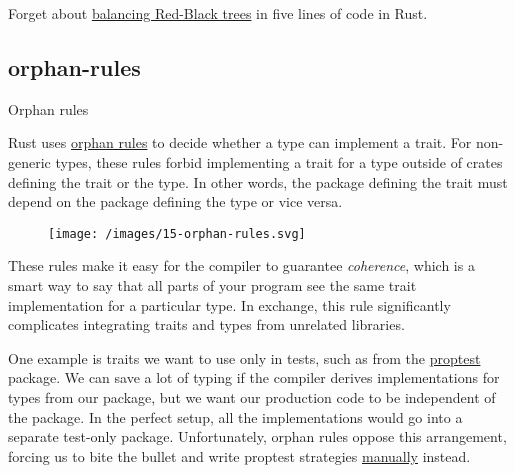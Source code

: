 \documentclass{article}
\begin{document}
Forget about \href{https://www.cs.tufts.edu/comp/150FP/archive/chris-okasaki/redblack99.pdf}{balancing Red-Black trees} in five lines of code in Rust.

\subsection{orphan-rules}{Orphan rules}

Rust uses \href{https://doc.rust-lang.org/reference/items/implementations.html?highlight=orphan#orphan-rules}{orphan rules} to decide whether a type can implement a trait.
For non-generic types, these rules forbid implementing a trait for a type outside of crates defining the trait or the type.
In other words, the package defining the trait must depend on the package defining the type or vice versa.

\begin{figure}[grayscale-diagram]
\texttt{[image: /images/15-orphan-rules.svg]}
\end{figure}

These rules make it easy for the compiler to guarantee \emph{coherence}, which is a smart way to say that all parts of your program see the same trait implementation for a particular type.
In exchange, this rule significantly complicates integrating traits and types from unrelated libraries.

One example is traits we want to use only in tests, such as \href{https://altsysrq.github.io/rustdoc/proptest/1.0.0/proptest/arbitrary/trait.Arbitrary.html}{} from the \href{https://crates.io/crates/proptest}{proptest} package.
We can save a lot of typing if the compiler derives implementations for types from our package, but we want our production code to be independent of the  package.
In the perfect setup, all the  implementations would go into a separate test-only package.
Unfortunately, orphan rules oppose this arrangement, forcing us to bite the bullet and write proptest strategies \href{https://altsysrq.github.io/proptest-book/proptest/tutorial/macro-prop-compose.html}{manually} instead.
\end{document}
